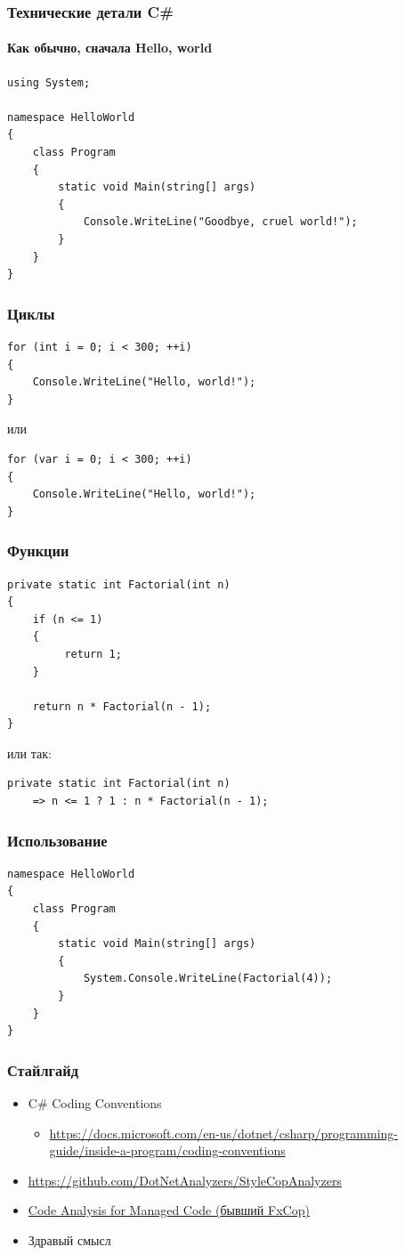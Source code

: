 \documentclass[xetex,mathserif,serif]{beamer}
\begin{document}
	\begin{frame}[fragile]
		\frametitle{Технические детали C\#}
		\framesubtitle{Как обычно, сначала Hello, world}
		\begin{verbatim}
using System;

namespace HelloWorld
{
    class Program
    {
        static void Main(string[] args)
        {
            Console.WriteLine("Goodbye, cruel world!");
        }
    }
}
		\end{verbatim}
	\end{frame}

	\begin{frame}[fragile]
		\frametitle{Циклы}
		\begin{verbatim}
for (int i = 0; i < 300; ++i)
{
    Console.WriteLine("Hello, world!");
}
		\end{verbatim}
		или
		\begin{verbatim}
for (var i = 0; i < 300; ++i)
{
    Console.WriteLine("Hello, world!");
}
		\end{verbatim}
	\end{frame}

	\begin{frame}[fragile]
		\frametitle{Функции}
		\begin{verbatim}
private static int Factorial(int n)
{
    if (n <= 1)
    {
         return 1;
    }

    return n * Factorial(n - 1);
}
		\end{verbatim}
		или так:
		\begin{verbatim}
private static int Factorial(int n) 
    => n <= 1 ? 1 : n * Factorial(n - 1);
		\end{verbatim}
	\end{frame}

	\begin{frame}[fragile]
		\frametitle{Использование}
		\begin{verbatim}
namespace HelloWorld
{
    class Program
    {
        static void Main(string[] args)
        {
            System.Console.WriteLine(Factorial(4));
        }
    }
}
		\end{verbatim}
	\end{frame}

	\begin{frame}
		\frametitle{Стайлгайд}
		\begin{itemize}
			\item C\# Coding Conventions
			\begin{itemize}
				\item \url{https://docs.microsoft.com/en-us/dotnet/csharp/programming-guide/inside-a-program/coding-conventions}
			\end{itemize}
			\item \url{https://github.com/DotNetAnalyzers/StyleCopAnalyzers}
			\item \href{https://msdn.microsoft.com/en-us/library/3z0aeatx.aspx}{Code Analysis for Managed Code (бывший FxCop)}
			\item Здравый смысл
		\end{itemize}
	\end{frame}
\end{document}
